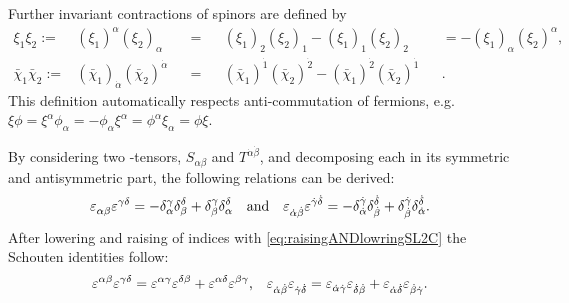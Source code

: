 Further invariant contractions of spinors are defined by
\begin{equation}
	\begin{alignedat}{5}
		\xi_{1} \xi_{2} :=& (\xi_{1})^{\alpha} (\xi_{2})_{\alpha}
		&&=&& (\xi_{1})_{2} (\xi_{2})_{1} - (\xi_{1})_{1} (\xi_{2})_{2}
		&&= - (\xi_{1})_{\alpha} (\xi_{2})^{\alpha}
		\text{,} \\
		\bar{\chi}_{1} \bar{\chi}_{2} :=& (\bar{\chi}_{1})_{\dot{\alpha}} (\bar{\chi}_{2})^{\dot{\alpha}}
		&&=&& (\bar{\chi}_{1})^{\dot{1}} (\bar{\chi}_{2})^{\dot{2}} - (\bar{\chi}_{1})^{\dot{2}} (\bar{\chi}_{2})^{\dot{1}} &&
		\text{.}
	\end{alignedat}
\end{equation}
This definition automatically respects anti-commutation of fermions, e.g. $ \xi \phi = \xi^{\alpha} \phi_{\alpha} = - \phi_{\alpha} \xi^{\alpha} = \phi^{\alpha} \xi_{\alpha} = \phi \xi $.\par
%
By considering two \SLtwoC{}-tensors, $ S_{\alpha \beta} $ and $ T^{\dot{\alpha} \dot{\beta}} $, and decomposing each in its symmetric and antisymmetric part, the following relations can be derived:
\begin{equation}
	\begin{aligned}
		\tensor{\eps}{_{\alpha \beta}} \tensor{\eps}{^{\gamma \delta}}
		= -\tensor*{\delta}{_{\alpha}^{\gamma}} \tensor*{\delta}{_{\beta}^{\delta}}
		+\tensor*{\delta}{_{\beta}^{\gamma}} \tensor*{\delta}{_{\alpha}^{\delta}}
		\quad \text{and} \quad
		\tensor{\eps}{_{\dot{\alpha} \dot{\beta}}} \tensor{\eps}{^{\dot{\gamma} \dot{\delta}}}
		= -\tensor*{\delta}{_{\dot{\alpha}}^{\dot{\gamma}}} \tensor*{\delta}{_{\dot{\beta}}^{\dot{\delta}}}
		+\tensor*{\delta}{_{\dot{\beta}}^{\dot{\gamma}}} \tensor*{\delta}{_{\dot{\alpha}}^{\dot{\delta}}}
		\text{.}
	\end{aligned} \label{eq:2epsilonsSL2C}
\end{equation}
After lowering and raising of indices with \cref{eq:raisingANDlowringSL2C} the Schouten identities follow:
\begin{equation}
	\begin{aligned}
		\tensor{\eps}{^{\alpha \beta}} \tensor{\eps}{^{\gamma \delta}}
		= \tensor{\eps}{^{\alpha \gamma}} \tensor{\eps}{^{\delta \beta}}
		+ \tensor{\eps}{^{\alpha \delta}} \tensor{\eps}{^{\beta \gamma}}
		\text{,} \quad
		\tensor{\eps}{_{\dot{\alpha} \dot{\beta}}} \tensor{\eps}{_{\dot{\gamma} \dot{\delta}}}
		= \tensor{\eps}{_{\dot{\alpha} \dot{\gamma}}} \tensor{\eps}{_{\dot{\delta} \dot{\beta}}}
		+ \tensor{\eps}{_{\dot{\alpha} \dot{\delta}}} \tensor{\eps}{_{\dot{\beta} \dot{\gamma}}}
		\text{.}
	\end{aligned}
\end{equation}
